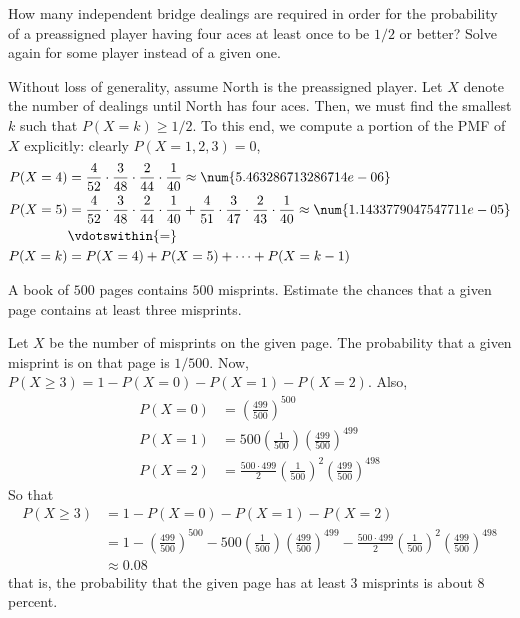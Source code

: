 \begin{problem}[Handout 8, \# 12]
  How many independent bridge dealings are required in order for the
  probability of a preassigned player having four aces at least once to be
  \(1/2\) or better? Solve again for some player instead of a given one.
\end{problem}
\begin{solution}
  Without loss of generality, assume North is the preassigned player. Let
  \(X\) denote the number of dealings until North has four aces. Then, we
  must find the smallest \(k\) such that \(P(X=k)\geq 1/2\). To this end,
  we compute a portion of the PMF of \(X\) explicitly: clearly
  \(P(X=1,2,3)=0\),
  \begin{align*}
    P(X=4)&=\frac{4}{52}\cdot\frac{3}{48}
            \cdot\frac{2}{44}\cdot\frac{1}{40}\approx\num{5.463286713286714e-06}\\
    P(X=5)&=\frac{4}{52}\cdot\frac{3}{48}
            \cdot\frac{2}{44}\cdot\frac{1}{40}
            +\frac{4}{51}\cdot\frac{3}{47}\cdot\frac{2}{43}\cdot\frac{1}{40}
            \approx\num{1.1433779047547711e-05}\\
          &\vdotswithin{=}\\
    P(X=k)&=P(X=4)+P(X=5)+\dotsb+P(X=k-1)
  \end{align*}
\end{solution}
\newpage

\begin{problem}[Handout 8, \# 13]
  A book of \(500\) pages contains \(500\) misprints. Estimate the chances
  that a given page contains at least three misprints.
\end{problem}
\begin{solution}
  Let $X$ be the number of misprints on the given page. The probability
  that a given misprint is on that page is $1/500$. Now,
  $P(X \geq 3) = 1- P(X=0) - P(X=1) - P(X=2)$. Also,
  \begin{align*}
    P(X=0) &= \left(\frac{499}{500}\right)^{500}\\
    P(X=1) &= 500\left(\frac{1}{500}\right)\left(\frac{499}{500}\right)^{499} \\
    P(X=2) &= \frac{500 \cdot 499}{2}\left(\frac{1}{500}\right)^2\left(\frac{499}{500}\right)^{498}
  \end{align*}
  So that
  \begin{align*}
    P(X \geq 3) &= 1- P(X=0) - P(X=1) - P(X=2)\\
                &= 1- \left(\frac{499}{500}\right)^{500} - 500\left(\frac{1}{500}\right)\left(\frac{499}{500}\right)^{499} - \frac{500 \cdot 499}{2}\left(\frac{1}{500}\right)^2\left(\frac{499}{500}\right)^{498}\\
                &\approx 0.08
  \end{align*}
  that is, the probability that the given page has at least \(3\) misprints
  is about \(8\) percent.
\end{solution}

